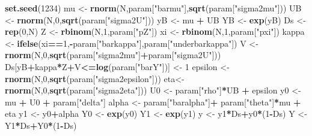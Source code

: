 \documentclass[]{book}
\newenvironment{Shaded}{\begin{snugshade}}{\end{snugshade}}
\newcommand{\DecValTok}[1]{\textcolor[rgb]{0.00,0.00,0.81}{#1}}
\newcommand{\KeywordTok}[1]{\textcolor[rgb]{0.13,0.29,0.53}{\textbf{#1}}}
\newcommand{\NormalTok}[1]{#1}
\newcommand{\OperatorTok}[1]{\textcolor[rgb]{0.81,0.36,0.00}{\textbf{#1}}}
\newcommand{\StringTok}[1]{\textcolor[rgb]{0.31,0.60,0.02}{#1}}
\theoremstyle{definition}
\theoremstyle{definition}
\theoremstyle{definition}
\theoremstyle{remark}
\begin{document}
\begin{Shaded}
\begin{Highlighting}[]
\KeywordTok{set.seed}\NormalTok{(}\DecValTok{1234}\NormalTok{)}
\NormalTok{mu <-}\StringTok{ }\KeywordTok{rnorm}\NormalTok{(N,param[}\StringTok{"barmu"}\NormalTok{],}\KeywordTok{sqrt}\NormalTok{(param[}\StringTok{"sigma2mu"}\NormalTok{]))}
\NormalTok{UB <-}\StringTok{ }\KeywordTok{rnorm}\NormalTok{(N,}\DecValTok{0}\NormalTok{,}\KeywordTok{sqrt}\NormalTok{(param[}\StringTok{"sigma2U"}\NormalTok{]))}
\NormalTok{yB <-}\StringTok{ }\NormalTok{mu }\OperatorTok{+}\StringTok{ }\NormalTok{UB }
\NormalTok{YB <-}\StringTok{ }\KeywordTok{exp}\NormalTok{(yB)}
\NormalTok{Ds <-}\StringTok{ }\KeywordTok{rep}\NormalTok{(}\DecValTok{0}\NormalTok{,N)}
\NormalTok{Z <-}\StringTok{ }\KeywordTok{rbinom}\NormalTok{(N,}\DecValTok{1}\NormalTok{,param[}\StringTok{"pZ"}\NormalTok{])}
\NormalTok{xi <-}\StringTok{ }\KeywordTok{rbinom}\NormalTok{(N,}\DecValTok{1}\NormalTok{,param[}\StringTok{"pxi"}\NormalTok{]) }
\NormalTok{kappa <-}\StringTok{ }\KeywordTok{ifelse}\NormalTok{(xi}\OperatorTok{==}\DecValTok{1}\NormalTok{,}\OperatorTok{-}\NormalTok{param[}\StringTok{"barkappa"}\NormalTok{],param[}\StringTok{"underbarkappa"}\NormalTok{])}
\NormalTok{V <-}\StringTok{ }\KeywordTok{rnorm}\NormalTok{(N,}\DecValTok{0}\NormalTok{,}\KeywordTok{sqrt}\NormalTok{(param[}\StringTok{"sigma2mu"}\NormalTok{]}\OperatorTok{+}\NormalTok{param[}\StringTok{"sigma2U"}\NormalTok{]))}
\NormalTok{Ds[yB}\OperatorTok{+}\NormalTok{kappa}\OperatorTok{*}\NormalTok{Z}\OperatorTok{+}\NormalTok{V}\OperatorTok{<=}\KeywordTok{log}\NormalTok{(param[}\StringTok{"barY"}\NormalTok{])] <-}\StringTok{ }\DecValTok{1} 
\NormalTok{epsilon <-}\StringTok{ }\KeywordTok{rnorm}\NormalTok{(N,}\DecValTok{0}\NormalTok{,}\KeywordTok{sqrt}\NormalTok{(param[}\StringTok{"sigma2epsilon"}\NormalTok{]))}
\NormalTok{eta<-}\StringTok{ }\KeywordTok{rnorm}\NormalTok{(N,}\DecValTok{0}\NormalTok{,}\KeywordTok{sqrt}\NormalTok{(param[}\StringTok{"sigma2eta"}\NormalTok{]))}
\NormalTok{U0 <-}\StringTok{ }\NormalTok{param[}\StringTok{"rho"}\NormalTok{]}\OperatorTok{*}\NormalTok{UB }\OperatorTok{+}\StringTok{ }\NormalTok{epsilon}
\NormalTok{y0 <-}\StringTok{ }\NormalTok{mu }\OperatorTok{+}\StringTok{  }\NormalTok{U0 }\OperatorTok{+}\StringTok{ }\NormalTok{param[}\StringTok{"delta"}\NormalTok{]}
\NormalTok{alpha <-}\StringTok{ }\NormalTok{param[}\StringTok{"baralpha"}\NormalTok{]}\OperatorTok{+}\StringTok{  }\NormalTok{param[}\StringTok{"theta"}\NormalTok{]}\OperatorTok{*}\NormalTok{mu }\OperatorTok{+}\StringTok{ }\NormalTok{eta}
\NormalTok{y1 <-}\StringTok{ }\NormalTok{y0}\OperatorTok{+}\NormalTok{alpha}
\NormalTok{Y0 <-}\StringTok{ }\KeywordTok{exp}\NormalTok{(y0)}
\NormalTok{Y1 <-}\StringTok{ }\KeywordTok{exp}\NormalTok{(y1)}
\NormalTok{y <-}\StringTok{ }\NormalTok{y1}\OperatorTok{*}\NormalTok{Ds}\OperatorTok{+}\NormalTok{y0}\OperatorTok{*}\NormalTok{(}\DecValTok{1}\OperatorTok{-}\NormalTok{Ds)}
\NormalTok{Y <-}\StringTok{ }\NormalTok{Y1}\OperatorTok{*}\NormalTok{Ds}\OperatorTok{+}\NormalTok{Y0}\OperatorTok{*}\NormalTok{(}\DecValTok{1}\OperatorTok{-}\NormalTok{Ds)}
\end{Highlighting}
\end{Shaded}
\end{document}
